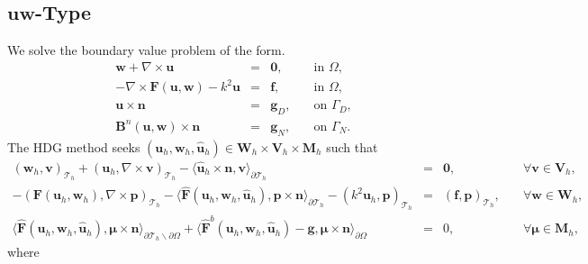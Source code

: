\documentclass[11pt]{article}
\begin{document}
\subsection{$\bm{uw}$-Type}

We solve the boundary value problem of the form.
\begin{equation}
\begin{array}{rcll}
\bm{w} + \nabla \times \bm{u}  & = & \bm{0} , & \quad \mbox{in } \Omega, \\
- \nabla \times \bm{F} (\bm{u},\bm{w}) - k^2 \bm{u} & = & \bm{f}, & \quad \mbox{in } \Omega, \\
\bm{u} \times \bm{n} & = & \bm{g}_D, & \quad \mbox{on } \Gamma_D , \\
\bm{B}^n(\bm{u},\bm{w}) \times \bm{n} & = & \bm{g}_N, & \quad \mbox{on } \Gamma_N .
\end{array}
\end{equation}
The HDG method seeks $(\bm{u}_h,\bm{w}_h,\widehat{\bm{u}}_h) \in \bm{W}_h \times \bm{V}_h \times \bm{M}_h$ such that
\begin{equation}
\begin{array}{rcll}
(\bm{w}_h, \bm{v})_{\mathcal{T}_h} + (\bm{u}_h, \nabla \times \bm{v})_{\mathcal{T}_h} - \langle \widehat{\bm{u}}_h \times \bm{n}, \bm{v} \rangle_{\partial \mathcal{T}_h}  & = & \bm{0}, & \quad \forall \bm{v} \in \bm{V}_h, \\[2ex] 
-(\bm{F} (\bm{u}_h,\bm{w}_h), \nabla \times \bm{p})_{\mathcal{T}_h} - \langle \widehat{\bm{F}} (\bm{u}_h, \bm{w}_h ,\widehat{\bm{u}}_h)  , \bm{p} \times \bm{n}\rangle_{\partial \mathcal{T}_h} - ( k^2 \bm{u}_h, \bm{p})_{\mathcal{T}_h} & = & (\bm{f}, \bm{p})_{\mathcal{T}_h}, & \quad \forall \bm{w} \in \bm{W}_h, \\[2ex]
\langle \widehat{\bm{F}} (\bm{u}_h,\bm{w}_h, \widehat{\bm{u}}_h) , \bm{\mu} \times \bm{n} \rangle_{\partial \mathcal{T}_h \backslash \partial \Omega} + \langle \widehat{\bm{F}}^b(\bm{u}_h, \bm{w}_h, \widehat{\bm{u}}_h) - \bm{g}, \bm{\mu} \times \bm{n} \rangle_{\partial \Omega}  & = & 0, & \quad \forall \bm{\mu} \in \bm{M}_h ,
\end{array}
\end{equation}
where
\end{document}
